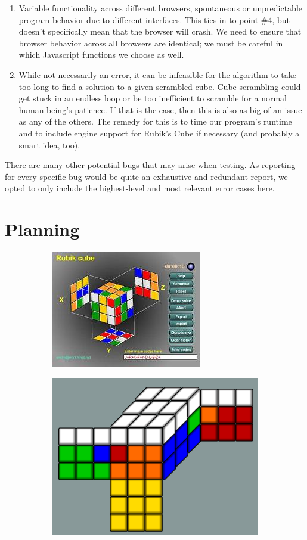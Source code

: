\documentclass[12pt]{article}
\begin{document}
\begin{enumerate}
\item Variable functionality across different browsers, spontaneous or unpredictable program behavior due to different interfaces. This ties in to point \#4, but doesn’t specifically mean that the browser will crash. We need to ensure that browser behavior across all browsers are identical; we must be careful in which Javascript functions we choose as well.
\item While not necessarily an error, it can be infeasible for the algorithm to take too long to find a solution to a given scrambled cube. Cube scrambling could get stuck in an endless loop or be too inefficient to scramble for a normal human being’s patience. If that is the case, then this is also as big of an issue as any of the others. The remedy for this is to time our program’s runtime and to include engine support for Rubik’s Cube if necessary (and probably a smart idea, too).
\end{enumerate}
\par
There are many other potential bugs that may arise when testing. As reporting for every specific bug would be quite an exhaustive and redundant report, we opted to only include the highest-level and most relevant error cases here. \\

\section{Planning}



\begin{figure}
\centering
\begin{subfigure}{.5\textwidth}
  \centering
  \includegraphics[width = .4\textwidth]{rubiks1.PNG}
  \label{fig:sub1}
\end{subfigure}%
\begin{subfigure}{.5\textwidth}
  \centering
  \includegraphics[width = .4\textwidth]{rubiks2.PNG}
  \label{fig:sub2}
\end{subfigure}
\label{fig:test}
\end{figure}
\end{document}
